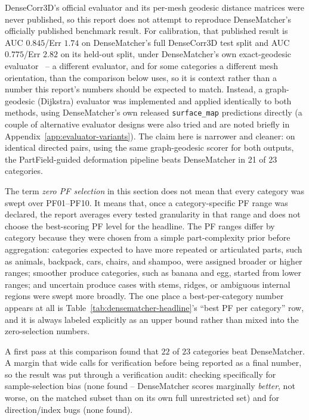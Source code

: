 \documentclass{article}
\newcommand{\AUC}{AUC}
\begin{document}
DenseCorr3D's official evaluator and its per-mesh geodesic distance matrices were never published, so
this report does not attempt to reproduce DenseMatcher's officially published benchmark result. For
calibration, that published result is \AUC{} $0.845$/Err $1.74$ on DenseMatcher's full DenseCorr3D
test split and \AUC{} $0.775$/Err $2.82$ on its held-out split, under DenseMatcher's own
exact-geodesic evaluator~\cite{densematcher} -- a different evaluator, and for some categories a
different mesh orientation, than the comparison below uses, so it is context rather than a number
this report's numbers should be expected to match. Instead, a graph-geodesic (Dijkstra) evaluator
was implemented and applied identically to both
methods, using DenseMatcher's own released \texttt{surface\_map} predictions directly (a couple of
alternative evaluator designs were also tried and are noted briefly in
Appendix~\ref{app:evaluator-variants}). The claim here is narrower and cleaner: on identical directed
pairs, using the same graph-geodesic scorer for both outputs, the PartField-guided deformation
pipeline beats DenseMatcher in 21 of 23 categories.

The term \emph{zero PF selection} in this section does not mean that every category was swept over
PF01--PF10. It means that, once a category-specific PF range was declared, the report averages
every tested granularity in that range and does not choose the best-scoring PF level for the
headline. The PF ranges differ by category because they were chosen from a simple part-complexity
prior before aggregation: categories expected to have more repeated or articulated parts, such as
animals, backpack, cars, chairs, and shampoo, were assigned broader or higher ranges; smoother
produce categories, such as banana and egg, started from lower ranges; and uncertain produce cases
with stems, ridges, or ambiguous internal regions were swept more broadly. The one place a 
best-per-category number appears at all is
Table~\ref{tab:densematcher-headline}'s ``best PF per category'' row, and it is always labeled
explicitly as an upper bound rather than mixed into the zero-selection numbers.

A first pass at this comparison found that $22$ of $23$ categories beat DenseMatcher. A margin that
wide calls for verification before being reported as a final number, so the result was put through
a verification audit: checking specifically for sample-selection bias (none found -- DenseMatcher
scores marginally \emph{better}, not worse, on the matched subset than on its own full unrestricted
set) and for direction/index bugs (none found).
\end{document}
